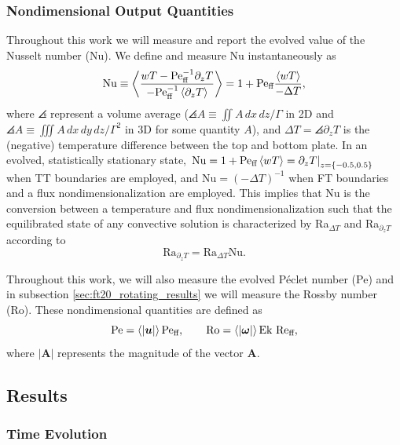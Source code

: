 \subsubsection{Nondimensional Output Quantities}
\label{sec:ft20_ra_nu_relations}
Throughout this work we will measure and report the evolved value of the Nusselt number (Nu).
We define and measure Nu instantaneously as
\begin{equation}
\text{Nu} \equiv \left\langle \frac{w T - \text{Pe}_{\text{ff}}^{-1} \partial_z T}{-\text{Pe}_{\text{ff}}^{-1} \left\langle \partial_z T \right\rangle} \right\rangle
= 1 + \text{Pe}_{\text{ff}}\frac{\left\langle w T \right\rangle}{-\Delta T},
\end{equation}
where $\angles{}$ represent a volume average ($\angles{A} \equiv \iint A\,dx\,dz / \Gamma$ in 2D and $\angles{A} \equiv \iiint A\,dx\,dy\,dz / \Gamma^2$ in 3D for some quantity $A$), and $\Delta T = \angles{\partial_z T}$ is the (negative) temperature difference between the top and bottom plate.
In an evolved, statistically stationary state, $\left.\text{Nu} = 1 + \text{Pe}_{\text{ff}}\left\langle wT \right\rangle = \partial_z T\right|_{z = \{-0.5, 0.5\}}$ when TT boundaries are employed, and $\text{Nu} = (-\Delta T)^{-1}$ when FT boundaries and a flux nondimensionalization are employed.
This implies that Nu is the conversion between a temperature and flux nondimensionalization such that the equilibrated state of any convective solution is characterized by Ra$_{\Delta T}$ and Ra$_{\partial_z T}$ according to
\begin{equation}
\text{Ra}_{\partial_z T} = \text{Ra}_{\Delta T} \text{Nu}.
\label{eqn:ra_relation}
\end{equation}

Throughout this work, we will also measure the evolved P\'{e}clet number (Pe) and in subsection \ref{sec:ft20_rotating_results} we will measure the Rossby number (Ro).
These nondimensional quantities are defined as
\begin{equation}
\text{Pe} = \left\langle |\bm{u}| \right\rangle\text{Pe}_{\text{ff}},\qquad \text{Ro} = \left\langle |\bm{\omega}| \right\rangle\text{Ek }\text{Re}_{\text{ff}},
\end{equation}
where $|\bm{A}|$ represents the magnitude of the vector $\bm{A}$.


\subsection{Results}
\label{sec:ft20_2d_results}

\subsubsection{Time Evolution}
\label{sec:ft20_time_evolution}


